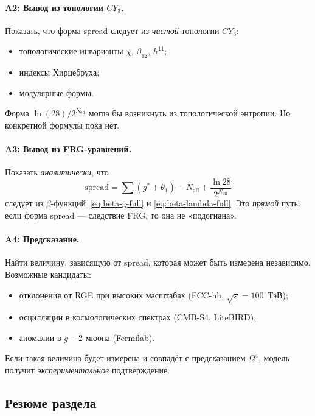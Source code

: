 \documentclass[11pt,a4paper]{article}
\newcommand{\CY}{\ensuremath{CY_3}}
\newcommand{\Om}{\ensuremath{\Omega^4}}
\theoremstyle{definition}
\begin{document}
\paragraph{A2: Вывод из топологии \texorpdfstring{$\CY$}{}.}
Показать, что форма spread следует из \emph{чистой}
топологии $\CY$:
\begin{itemize}
    \item топологические инварианты $\chi$, $\beta_{12}$, $h^{11}$;
    \item индексы Хирцебруха;
    \item модулярные формы.
\end{itemize}
Форма $\ln(28)/2^{N_{\text{eff}}}$ могла бы возникнуть
из топологической энтропии. Но конкретной формулы пока нет.

\paragraph{A3: Вывод из FRG-уравнений.}
Показать \emph{аналитически}, что
\begin{equation}
    \text{spread} = \sum(g^* + \theta_1) - N_{\text{eff}}
    + \frac{\ln 28}{2^{N_{\text{eff}}}}
\end{equation}
следует из $\beta$-функций~\eqref{eq:beta-g-full} и
\eqref{eq:beta-lambda-full}. Это \emph{прямой} путь: если
форма spread --- следствие FRG, то она не «подогнана».

\paragraph{A4: Предсказание.}
Найти величину, зависящую от spread, которая может быть
измерена независимо. Возможные кандидаты:
\begin{itemize}
    \item отклонения от RGE при высоких масштабах
          (FCC-hh, $\sqrt{s} = 100$~ТэВ);
    \item осцилляции в космологических спектрах
          (CMB-S4, LiteBIRD);
    \item аномалии в $g-2$ мюона (Fermilab).
\end{itemize}
Если такая величина будет измерена и совпадёт с
предсказанием $\Om$, модель получит \emph{экспериментальное}
подтверждение.

\subsection{Резюме раздела}
\label{subsec:open-summary}
\end{document}
